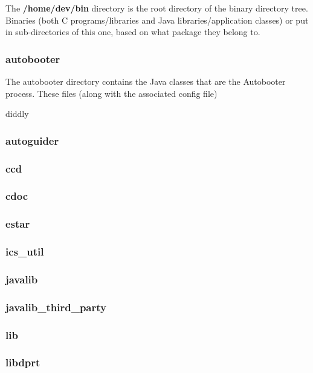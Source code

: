 \documentclass[10pt,a4paper]{article}
\begin{document}
The {\bf /home/dev/bin} directory is the root directory of the binary directory tree. Binaries (both C programs/libraries and Java libraries/application classes) or put in sub-directories of this one, based on what package they belong to.

\subsubsection{autobooter}

The autobooter directory contains the Java classes that are the Autobooter process. These files (along with the associated config file)

diddly


\subsubsection{autoguider}

\subsubsection{ccd}

\subsubsection{cdoc}

\subsubsection{estar}

\subsubsection{ics\_util}

\subsubsection{javalib}

\subsubsection{javalib\_third\_party}

\subsubsection{lib}

\subsubsection{libdprt}
\end{document}
